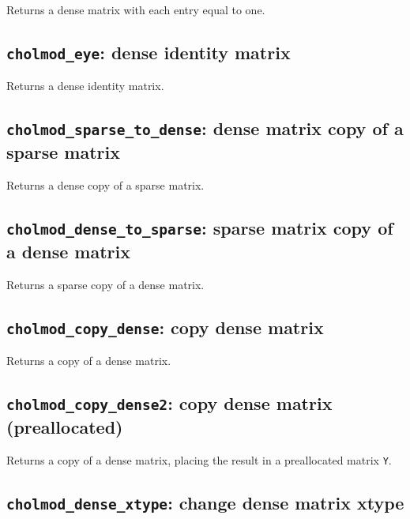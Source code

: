 \documentclass[11pt]{article}
\begin{document}

Returns a dense matrix with each entry equal to one.

\subsection{{\tt cholmod\_eye}: dense identity matrix}


Returns a dense identity matrix.

\newpage \subsection{{\tt cholmod\_sparse\_to\_dense}: dense matrix copy of a sparse matrix}


Returns a dense copy of a sparse matrix.

\subsection{{\tt cholmod\_dense\_to\_sparse}: sparse matrix copy of a dense matrix}


Returns a sparse copy of a dense matrix.

\subsection{{\tt cholmod\_copy\_dense}: copy dense matrix}


Returns a copy of a dense matrix.

\newpage \subsection{{\tt cholmod\_copy\_dense2}: copy dense matrix (preallocated)}


Returns a copy of a dense matrix, placing the result in a preallocated matrix {\tt Y}.

\subsection{{\tt cholmod\_dense\_xtype}: change dense matrix xtype}
\end{document}
